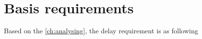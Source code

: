 \newcommand{\reqbasis}{The delay unit must delay the input signal, in time defined by external unit.}

\section{Basis requirements}
Based on the \autoref{ch:analysing}, the delay requirement is as following

\begin{requirement}\label{req:dsp}
\end{requirement}

\begin{requirement}\label{req:software}
\end{requirement}



